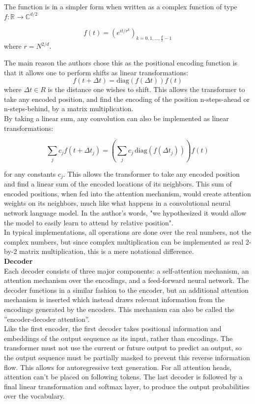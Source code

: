 The function is in a simpler form when written as a complex function of type
\(f: \mathbb{R} \to \mathbb C^{d/2}\)

\[f(t) = \left(e^{it/r^k}\right)_{k=0, 1, \ldots, \frac d 2 - 1}\] 
where \(r = N^{2/d}\).

The main reason the authors chose this as the positional encoding function is that it allows one to perform shifts as linear transformations:
\[f(t + \Delta t) = \mathrm{diag}(f(\Delta t)) f(t)\]
where \(\Delta t \in R\) is the distance one wishes to shift. This allows the transformer to take any encoded position, and find the encoding of the position n-steps-ahead or n-steps-behind, by a matrix multiplication.
\\

By taking a linear sum, any convolution can also be implemented as linear transformations:

\[\sum_j c_j f(t + \Delta t_j) = \left(\sum_j c_j \,\mathrm{diag}(f(\Delta t_j))\right) f(t)\]

for any constants \(c_j\). This allows the transformer to take any encoded position and find a linear sum of the encoded locations of its neighbors. This sum of encoded positions, when fed into the attention mechanism, would create attention weights on its neighbors, much like what happens in a convolutional neural network language model. In the author's words, "we hypothesized it would allow the model to easily learn to attend by relative position".
\\

In typical implementations, all operations are done over the real numbers, not the complex numbers, but since complex multiplication can be implemented as real 2-by-2 matrix multiplication, this is a mere notational difference.
\\

\textbf{Decoder}\\
Each decoder consists of three major components: a self-attention mechanism, an attention mechanism over the encodings, and a feed-forward neural network. The decoder functions in a similar fashion to the encoder, but an additional attention mechanism is inserted which instead draws relevant information from the encodings generated by the encoders. This mechanism can also be called the ''encoder-decoder attention''.
\\

Like the first encoder, the first decoder takes positional information and embeddings of the output sequence as its input, rather than encodings. The transformer must not use the current or future output to predict an output, so the output sequence must be partially masked to prevent this reverse information flow. This allows for autoregressive text generation. For all attention heads, attention can't be placed on following tokens. The last decoder is followed by a final linear transformation and softmax layer, to produce the output probabilities over the vocabulary.
\\

